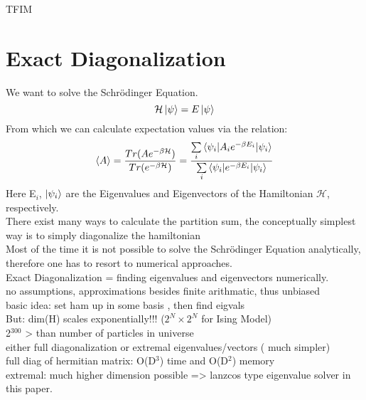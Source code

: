 \documentclass{article}
\begin{document}
TFIM
\section{Exact Diagonalization}
We want to solve the Schr\"odinger Equation.
\begin{equation}
\label{eq:1}
\mathcal{H} \ket{\psi} = E \ket{\psi}
\end{equation}
From which we can calculate expectation values via the relation:
\begin{equation}
\label{eq:2}
\braket{A} = \frac{Tr(Ae^{-\beta \mathcal H})}{Tr(e^{-\beta \mathcal H})} = \frac{\sum\limits_i \braket{\psi_i|A_ie^{-\beta E_{i}}|\psi_{i}}}{\sum\limits_i \braket{\psi_i|e^{-\beta E_i}|\psi_{i}}}
\end{equation}
Here E$_{i}$, $\ket{\psi_i}$ are the Eigenvalues and  Eigenvectors of the Hamiltonian $\mathcal{H}$, respectively.\\
There exist many ways to calculate the partition sum, the conceptually simplest way is to simply diagonalize the hamiltonian\\
Most of the time it is not possible to solve the Schr\"odinger Equation analytically, therefore one has to resort to numerical approaches.\\
Exact Diagonalization = finding eigenvalues and eigenvectors numerically.\\
no assumptions, approximations besides finite arithmatic, thus unbiased\\
basic idea: set ham up in some basis , then find eigvals\\
But: dim(H) scales exponentially!!! ($2^{N}\times 2^N$ for Ising Model)\\
2$^{300}$ > than number of particles in universe\\
either full diagonalization or extremal eigenvalues/vectors ( much simpler)\\
full diag of hermitian matrix: O(D$^3$) time and O(D$^2$) memory\\
extremal: much higher dimension possible => lanzcos type eigenvalue solver in this paper.
\end{document}
